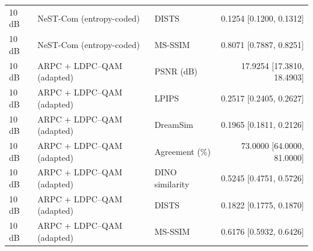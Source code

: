 \begin{table}[t]
\begin{tabular}{lllr}
10 dB & NeST-Com (entropy-coded) & DISTS & 0.1254 [0.1200, 0.1312] \\
10 dB & NeST-Com (entropy-coded) & MS-SSIM & 0.8071 [0.7887, 0.8251] \\
10 dB & ARPC + LDPC--QAM (adapted) & PSNR (dB) & 17.9254 [17.3810, 18.4903] \\
10 dB & ARPC + LDPC--QAM (adapted) & LPIPS & 0.2517 [0.2405, 0.2627] \\
10 dB & ARPC + LDPC--QAM (adapted) & DreamSim & 0.1965 [0.1811, 0.2126] \\
10 dB & ARPC + LDPC--QAM (adapted) & Agreement (\%) & 73.0000 [64.0000, 81.0000] \\
10 dB & ARPC + LDPC--QAM (adapted) & DINO similarity & 0.5245 [0.4751, 0.5726] \\
10 dB & ARPC + LDPC--QAM (adapted) & DISTS & 0.1822 [0.1775, 0.1870] \\
10 dB & ARPC + LDPC--QAM (adapted) & MS-SSIM & 0.6176 [0.5932, 0.6426] \\
\bottomrule
\end{tabular}
\end{table}

